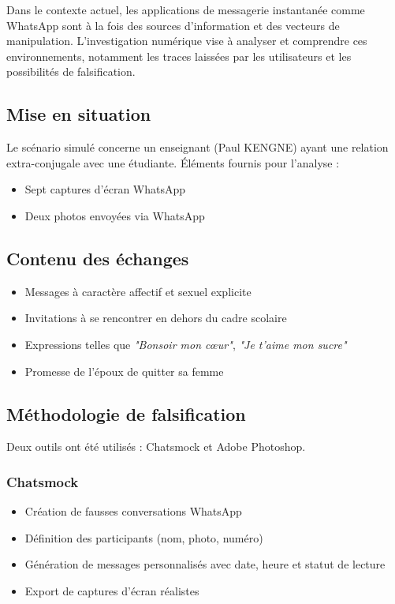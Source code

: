 \documentclass[12pt]{article}
\begin{document}
\begin{center}
Dans le contexte actuel, les applications de messagerie instantanée comme WhatsApp sont à la fois des sources d'information et des vecteurs de manipulation. L'investigation numérique vise à analyser et comprendre ces environnements, notamment les traces laissées par les utilisateurs et les possibilités de falsification.

\subsection*{ Mise en situation}
Le scénario simulé concerne un enseignant (Paul KENGNE) ayant une relation extra-conjugale avec une étudiante.  
Éléments fournis pour l'analyse :
\begin{itemize}[leftmargin=*, label=\textbullet]
    \item Sept captures d'écran WhatsApp
    \item Deux photos envoyées via WhatsApp
\end{itemize}

\subsection{ Contenu des échanges}
\begin{itemize}[leftmargin=*, label=\textbullet]
    \item Messages à caractère affectif et sexuel explicite
    \item Invitations à se rencontrer en dehors du cadre scolaire
    \item Expressions telles que \emph{"Bonsoir mon cœur"}, \emph{"Je t'aime mon sucre"}
    \item Promesse de l'époux de quitter sa femme
\end{itemize}

\subsection{ Méthodologie de falsification}
Deux outils ont été utilisés : Chatsmock et Adobe Photoshop.

\subsubsection{ Chatsmock}
\begin{itemize}[leftmargin=*, label=\textbullet]
    \item Création de fausses conversations WhatsApp
    \item Définition des participants (nom, photo, numéro)
    \item Génération de messages personnalisés avec date, heure et statut de lecture
    \item Export de captures d'écran réalistes
\end{itemize}


\end{center}
\end{document}
